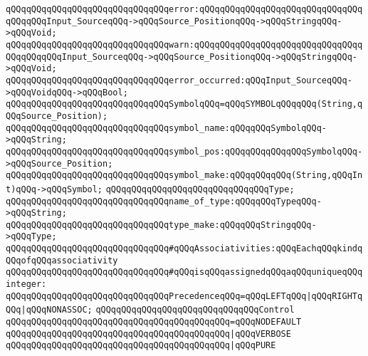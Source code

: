 \newline
\verb|qQQqqQQqqQQqqQQqqQQqqQQqqQQqqQQqerror:qQQqqQQqqQQqqQQqqQQqqQQqqQQqqQQqqQQqqQQqInput_SourceqQQq->qQQqSource_PositionqQQq->qQQqStringqQQq->qQQqVoid;|\newline
\verb|qQQqqQQqqQQqqQQqqQQqqQQqqQQqqQQqwarn:qQQqqQQqqQQqqQQqqQQqqQQqqQQqqQQqqQQqqQQqqQQqInput_SourceqQQq->qQQqSource_PositionqQQq->qQQqStringqQQq->qQQqVoid;|\newline
\verb|qQQqqQQqqQQqqQQqqQQqqQQqqQQqqQQqerror_occurred:qQQqInput_SourceqQQq->qQQqVoidqQQq->qQQqBool;|\newline
\newline
\verb|qQQqqQQqqQQqqQQqqQQqqQQqqQQqqQQqSymbolqQQq=qQQqSYMBOLqQQqqQQq(String,qQQqSource_Position);|\newline
\verb|qQQqqQQqqQQqqQQqqQQqqQQqqQQqqQQqsymbol_name:qQQqqQQqSymbolqQQq->qQQqString;|\newline
\verb|qQQqqQQqqQQqqQQqqQQqqQQqqQQqqQQqsymbol_pos:qQQqqQQqqQQqqQQqSymbolqQQq->qQQqSource_Position;|\newline
\verb|qQQqqQQqqQQqqQQqqQQqqQQqqQQqqQQqsymbol_make:qQQqqQQqqQQq(String,qQQqInt)qQQq->qQQqSymbol;|\newline
\newline
\verb|qQQqqQQqqQQqqQQqqQQqqQQqqQQqqQQqType;|\newline
\verb|qQQqqQQqqQQqqQQqqQQqqQQqqQQqqQQqname_of_type:qQQqqQQqTypeqQQq->qQQqString;|\newline
\verb|qQQqqQQqqQQqqQQqqQQqqQQqqQQqqQQqtype_make:qQQqqQQqStringqQQq->qQQqType;|\newline
\newline
\verb|qQQqqQQqqQQqqQQqqQQqqQQqqQQqqQQq#qQQqAssociativities:qQQqEachqQQqkindqQQqofqQQqassociativity|\newline
\verb|qQQqqQQqqQQqqQQqqQQqqQQqqQQqqQQq#qQQqisqQQqassignedqQQqaqQQquniqueqQQqinteger:|\newline
\newline
\verb|qQQqqQQqqQQqqQQqqQQqqQQqqQQqqQQqPrecedenceqQQq=qQQqLEFTqQQq|\verb#|qQQqRIGHTqQQq|qQQqNONASSOC;#\newline
\newline
\verb|qQQqqQQqqQQqqQQqqQQqqQQqqQQqqQQqControl|\newline
\verb|qQQqqQQqqQQqqQQqqQQqqQQqqQQqqQQqqQQqqQQqqQQq=qQQqNODEFAULT|\newline
\verb|qQQqqQQqqQQqqQQqqQQqqQQqqQQqqQQqqQQqqQQqqQQq|\verb#|qQQqVERBOSE#\newline
\verb|qQQqqQQqqQQqqQQqqQQqqQQqqQQqqQQqqQQqqQQqqQQq|\verb#|qQQqPURE#\newline
